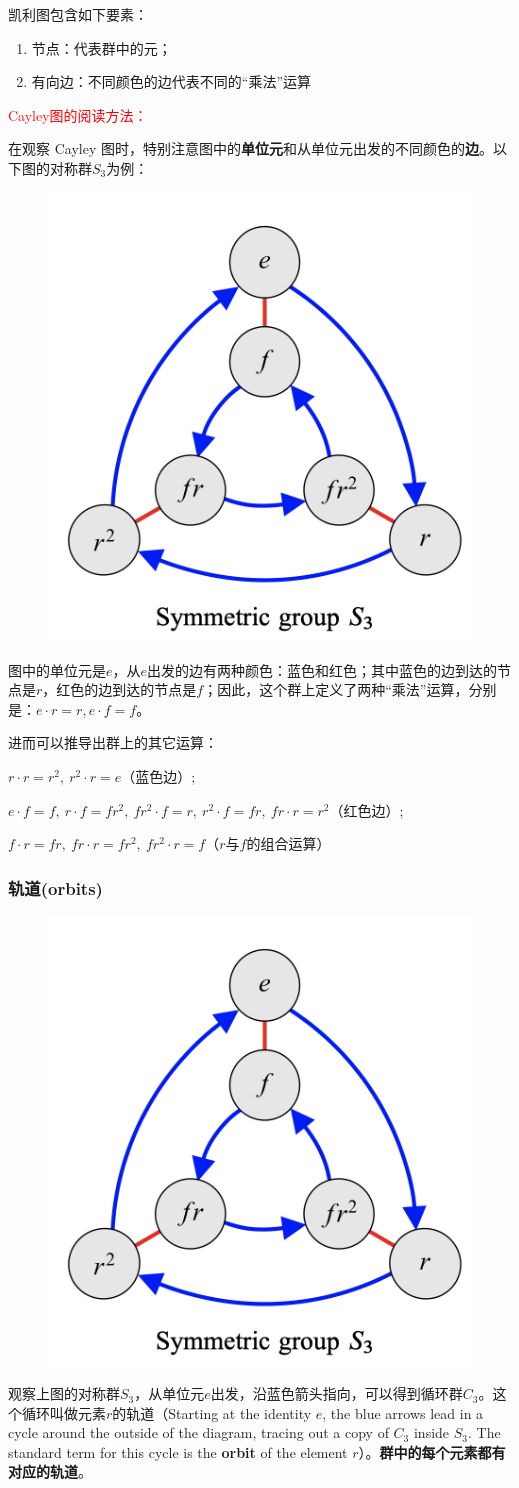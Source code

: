 \documentclass[12pt]{article}
\begin{document}
凯利图包含如下要素：
\begin{enumerate}
\setlength{\itemsep}{0pt}
\setlength{\parsep}{0pt}
\setlength{\parskip}{0pt}
    \item 节点：代表群中的元；
    \item 有向边：不同颜色的边代表不同的“乘法”运算
\end{enumerate}

\begin{framed}
\textcolor{red}{Cayley图的阅读方法：}

在观察 Cayley 图时，特别注意图中的\textbf{单位元}和从单位元出发的不同颜色的\textbf{边}。以下图的对称群$S_3$为例：
\begin{figure}[H]
    \centering
    \includegraphics[width=.3\textwidth]{fig/Group/Cayley-S3.png}
\end{figure}

图中的单位元是$e$，从$e$出发的边有两种颜色：蓝色和红色；其中蓝色的边到达的节点是$r$，红色的边到达的节点是$f$；因此，这个群上定义了两种“乘法”运算，分别是：$e \cdot r = r,e \cdot f = f$。

进而可以推导出群上的其它运算：

$r \cdot r = r^2, \ r^2 \cdot r = e$（蓝色边）;

$e \cdot f = f, \ r \cdot f = fr^2, \ fr^2 \cdot f = r, \ r^2 \cdot f = fr, \ fr \cdot r = r^2$（红色边）;

$f \cdot r = fr, \ fr \cdot r = fr^2, \ fr^2 \cdot r = f$（$r$与$f$的组合运算）
\end{framed}

\subsubsection{轨道(orbits)}
\begin{figure}[H]
    \centering
    \includegraphics[width=.3\textwidth]{fig/Group/Cayley-S3.png}
\end{figure}
观察上图的对称群$S_3$，从单位元$e$出发，沿蓝色箭头指向，可以得到循环群$C_3$。这个循环叫做元素$r$的轨道（Starting at the identity $e$, the blue arrows lead in a cycle around the outside of the diagram, tracing out a copy of $C_3$ inside $S_3$. The standard term for this cycle is the \textbf{orbit} of the element $r$）。\textbf{群中的每个元素都有对应的轨道}。
\end{document}
